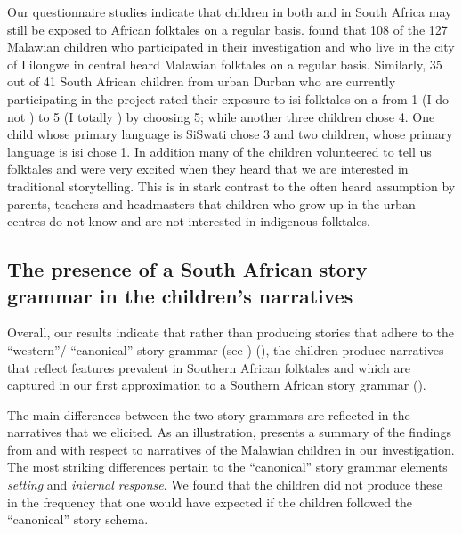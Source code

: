 \documentclass[output=paper,modfonts]{langscibook}
\begin{document}
Our questionnaire studies indicate that children in both  and in South Africa may still be exposed to African folktales on a regular basis. \citet{Tappe2013} found that 108 of the 127 Malawian children who participated in their investigation and who live in the city of Lilongwe in central  heard Malawian folktales on a regular basis. Similarly, 35 out of 41 South African children from urban Durban who are currently participating in the project rated their exposure to isi folktales on a  from 1 (I do not ) to 5 (I totally ) by choosing 5; while another three children chose 4. One child whose primary language is SiSwati chose 3 and two children, whose primary language is isi chose 1. In addition many of the children volunteered to tell us folktales and were very excited when they heard that we are interested in traditional storytelling. This is in stark contrast to the often heard assumption by parents, teachers and headmasters that children who grow up in the urban centres do not know and are not interested in indigenous folktales.

\subsection{The presence of a South African story grammar in the children’s narratives}\label{sec:tappe:4.2}



Overall, our results indicate that rather than producing stories that adhere to the “western”/ “canonical” story grammar (see ) (\citealt{Stein1979}), the children produce narratives that reflect features prevalent in Southern African folktales and which are captured in our first approximation to a Southern African story grammar (). 

The main differences between the two story grammars are reflected in the narratives that we elicited. As an illustration,  presents a summary of the findings from  \citet{Tappe2013} and \citet{Hara2014} with respect to narratives of the Malawian children in our investigation. The most striking differences pertain to the “canonical” story grammar elements \textit{setting} and \textit{internal response}. We found that the children did not produce these in the frequency that one would have expected if the children followed the “canonical” story schema.
\end{document}
